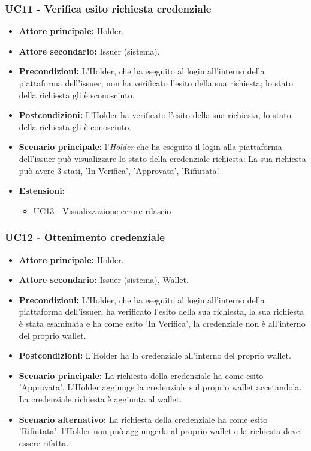\subsubsection{UC11 - Verifica esito richiesta credenziale} 
\begin{itemize}
    \item \textbf{Attore principale:} Holder.
    \item \textbf{Attore secondario:} Issuer (sistema).
    \item \textbf{Precondizioni:} L'Holder, che ha eseguito al login all'interno della piattaforma dell'issuer, non ha verificato l'esito della sua richiesta; lo stato della richiesta gli è sconosciuto.
    \item \textbf{Postcondizioni:} L'Holder ha verificato l'esito della sua richiesta, lo stato della richiesta gli è conosciuto.
    \item \textbf{Scenario principale:} l'\textit{Holder} che ha eseguito il login alla piattaforma dell'issuer può visualizzare lo stato della credenziale richiesta: 
    La sua richiesta può avere 3 stati, 'In Verifica', 'Approvata', 'Rifiutata'.\\
    \item \textbf{Estensioni:}
    \begin{itemize}
    \item  UC13 - Visualizzazione errore rilascio
    \end{itemize}
\end{itemize}

\subsubsection{UC12 - Ottenimento credenziale}
\begin{itemize}
    \item \textbf{Attore principale:} Holder.
    \item \textbf{Attore secondario:} Issuer (sistema), Wallet.
    \item \textbf{Precondizioni:} L'Holder, che ha eseguito al login all'interno della piattaforma dell'issuer, ha verificato l'esito della sua richiesta, la sua richiesta è stata esaminata e ha come esito 'In Verifica', la credenziale non è all'interno del proprio wallet.
    \item \textbf{Postcondizioni:} L'Holder ha la credenziale all'interno del proprio wallet.
    \item \textbf{Scenario principale:} La richiesta della credenziale ha come esito 'Approvata',
    L’Holder aggiunge la credenziale sul proprio wallet accetandola.\\
    La credenziale richiesta è aggiunta al wallet.
    \item \textbf{Scenario alternativo:} La richiesta della credenziale ha come esito 'Rifiutata', l'Holder non può aggiungerla al proprio wallet e la richiesta deve essere rifatta.
\end{itemize}

